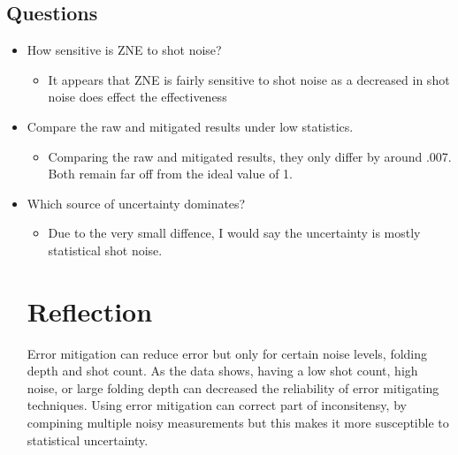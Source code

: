 \documentclass{exam}
\begin{document}
    \subsection{Questions}
    \begin{itemize}
        \item How sensitive is ZNE to shot noise?
        \begin{itemize}
            \item It appears that ZNE is fairly sensitive to shot noise as a decreased in shot noise does effect the effectiveness
        \end{itemize}
        \item Compare the raw and mitigated results under low statistics.
        \begin{itemize}
            \item Comparing the raw and mitigated results, they only differ by around .007. Both remain far off from the ideal value of 1.
        \end{itemize}
        \item Which source of uncertainty dominates?
        \begin{itemize}
            \item Due to the very small diffence, I would say the uncertainty is mostly statistical shot noise.
        \end{itemize}
    \section{Reflection}
        Error mitigation can reduce error but only for certain noise levels, folding depth and shot count. As the data shows, having a low shot count, high noise, or large folding depth can decreased the reliability of error mitigating techniques.
        Using error mitigation can correct part of inconsitensy, by compining multiple noisy measurements but this makes it more susceptible to statistical uncertainty.
    \end{itemize}
\end{document}
